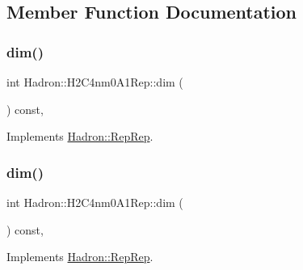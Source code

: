 \subsection{Member Function Documentation}
\mbox{\label{structHadron_1_1H2C4nm0A1Rep_a70c05d0b9c939701dadbedc28475a911}} 
\subsubsection{\texorpdfstring{dim()}{dim()}\hspace{0.1cm}{\footnotesize\ttfamily [1/5]}}
{\footnotesize\ttfamily int Hadron\+::\+H2\+C4nm0\+A1\+Rep\+::dim (\begin{DoxyParamCaption}{ }\end{DoxyParamCaption}) const\hspace{0.3cm}{\ttfamily [inline]}, {\ttfamily [virtual]}}



Implements \mbox{\hyperlink{structHadron_1_1RepRep_a92c8802e5ed7afd7da43ccfd5b7cd92b}{Hadron\+::\+Rep\+Rep}}.

\mbox{\label{structHadron_1_1H2C4nm0A1Rep_a70c05d0b9c939701dadbedc28475a911}} 
\subsubsection{\texorpdfstring{dim()}{dim()}\hspace{0.1cm}{\footnotesize\ttfamily [2/5]}}
{\footnotesize\ttfamily int Hadron\+::\+H2\+C4nm0\+A1\+Rep\+::dim (\begin{DoxyParamCaption}{ }\end{DoxyParamCaption}) const\hspace{0.3cm}{\ttfamily [inline]}, {\ttfamily [virtual]}}



Implements \mbox{\hyperlink{structHadron_1_1RepRep_a92c8802e5ed7afd7da43ccfd5b7cd92b}{Hadron\+::\+Rep\+Rep}}.

\mbox{\label{structHadron_1_1H2C4nm0A1Rep_a70c05d0b9c939701dadbedc28475a911}} 
